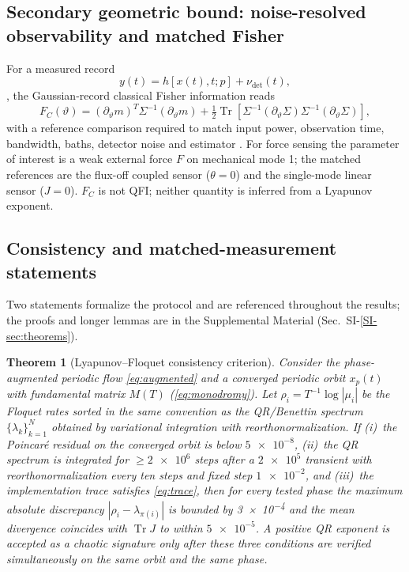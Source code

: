 \documentclass[Phys]{SciPost}
\newtheorem{theorem}{Theorem}
\newcommand{\Tr}{\operatorname{Tr}}
\begin{document}
\subsection{Secondary geometric bound: noise-resolved observability and matched Fisher}

For a measured record
\begin{equation}
y(t)=h[x(t),t;p]+\nu_{\mathrm{det}}(t),
\end{equation}
\cite{clerk2010,gardiner1985,walls2008,ford1988}, the Gaussian-record
classical Fisher information reads
\begin{equation}\label{eq:fisher}
F_C(\vartheta)= (\partial_\vartheta m)^T\Sigma^{-1}(\partial_\vartheta m)
+\tfrac12\Tr\!\left[\Sigma^{-1}(\partial_\vartheta\Sigma)\Sigma^{-1}(\partial_\vartheta\Sigma)\right],
\end{equation}
with a reference comparison required to match input power, observation time, bandwidth, baths, detector noise and estimator \cite{braunstein1994,purdy2017,teufel2011,gavartin2012,li2021a,qvarfort2018}. For force sensing the parameter of interest is a weak external force $F$ on mechanical mode 1; the matched references are the flux-off coupled sensor ($\theta=0$) and the single-mode linear sensor ($J=0$). $F_C$ is not QFI; neither quantity is inferred from a Lyapunov exponent.

\subsection{Consistency and matched-measurement statements}

Two statements formalize the protocol and are referenced throughout the results; the proofs and longer lemmas are in the Supplemental Material (Sec.~SI-\ref{SI-sec:theorems}).

\begin{theorem}[Lyapunov--Floquet consistency criterion]
Consider the phase-augmented periodic flow \eqref{eq:augmented} and a converged periodic orbit $x_p(t)$ with fundamental matrix $M(T)$ (\cref{eq:monodromy}). Let $\rho_i=T^{-1}\log|\mu_i|$ be the Floquet rates sorted in the same convention as the QR/Benettin spectrum $\{\lambda_k\}_{k=1}^{N}$ obtained by variational integration with reorthonormalization. If (i)~the Poincar\'e residual on the converged orbit is below $\num{5e-8}$, (ii)~the QR spectrum is integrated for $\geq\num{2e6}$ steps after a $\num{2e5}$ transient with reorthonormalization every ten steps and fixed step $\num{1e-2}$, and (iii)~the implementation trace satisfies \eqref{eq:trace}, then for every tested phase the maximum absolute discrepancy $|\rho_i-\lambda_{\pi(i)}|$ is bounded by \num{3e-4} and the mean divergence coincides with $\Tr J$ to within $\num{5e-5}$. A positive QR exponent is accepted as a chaotic signature only after these three conditions are verified simultaneously on the same orbit and the same phase.
\end{theorem}
\end{document}

